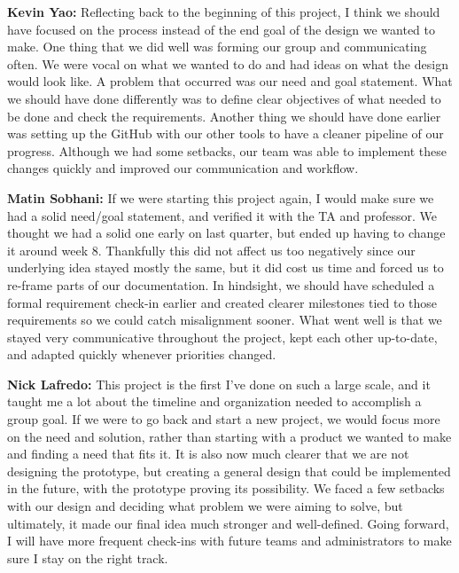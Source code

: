 \documentclass[journal, onecolumn]{IEEEtran}
\begin{document}
\textbf{Kevin Yao:} Reflecting back to the beginning of this project, I think we should have focused on the process instead of the end goal of the design we wanted to make. One thing that we did well was forming our group and communicating often. We were vocal on what we wanted to do and had ideas on what the design would look like. A problem that occurred was our need and goal statement. What we should have done differently was to define clear objectives of what needed to be done and check the requirements. Another thing we should have done earlier was setting up the GitHub with our other tools to have a cleaner pipeline of our progress. Although we had some setbacks, our team was able to implement these changes quickly and improved our communication and workflow.

\vspace{1em}

\textbf{Matin Sobhani:} If we were starting this project again, I would make sure we had a solid need/goal statement, and verified it with the TA and professor. We thought we had a solid one early on last quarter, but ended up having to change it around week 8. Thankfully this did not affect us too negatively since our underlying idea stayed mostly the same, but it did cost us time and forced us to re-frame parts of our documentation. In hindsight, we should have scheduled a formal requirement check-in earlier and created clearer milestones tied to those requirements so we could catch misalignment sooner. What went well is that we stayed very communicative throughout the project, kept each other up-to-date, and adapted quickly whenever priorities changed.

\vspace{1em}

\textbf{Nick Lafredo:} This project is the first I've done on such a large scale, and it taught me a lot about the timeline and organization needed to accomplish a group goal. If we were to go back and start a new project, we would focus more on the need and solution, rather than starting with a product we wanted to make and finding a need that fits it. It is also now much clearer that we are not designing the prototype, but creating a general design that could be implemented in the future, with the prototype proving its possibility. We faced a few setbacks with our design and deciding what problem we were aiming to solve, but ultimately, it made our final idea much stronger and well-defined. Going forward, I will have more frequent check-ins with future teams and administrators to make sure I stay on the right track.
\vspace{1em}
\end{document}
